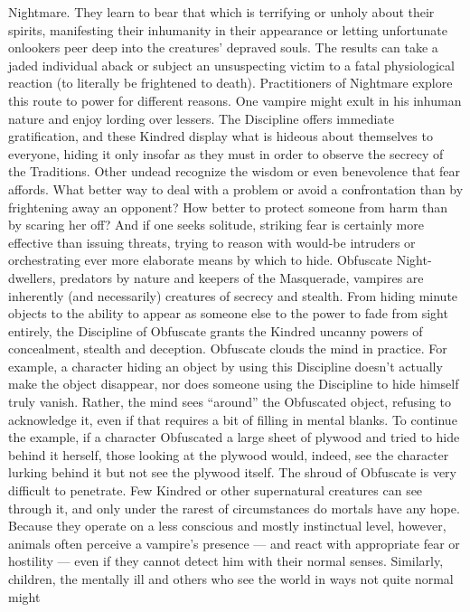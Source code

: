 \documentclass[10pt,a4paper]{article}
\begin{document}
Nightmare. They learn to bear that which is terrifying or unholy about their
spirits, manifesting their inhumanity in their appearance or letting
unfortunate onlookers peer deep into the creatures’ depraved souls. The
results can take a jaded individual aback or subject an unsuspecting victim
to a fatal physiological reaction (to literally be frightened to death).
Practitioners of Nightmare explore this route to power for different reasons.
One vampire might exult in his inhuman nature and enjoy lording over
lessers. The Discipline offers immediate gratification, and these Kindred
display what is hideous about themselves to everyone, hiding it only insofar
as they must in order to observe the secrecy of the Traditions. Other undead
recognize the wisdom or even benevolence that fear affords. What better
way to deal with a problem or avoid a confrontation than by frightening
away an opponent? How better to protect someone from harm than by
scaring her off? And if one seeks solitude, striking fear is certainly more
effective than issuing threats, trying to reason with would-be intruders or
orchestrating ever more elaborate means by which to hide.
Obfuscate
Night-dwellers, predators by nature and keepers of the Masquerade,
vampires are inherently (and necessarily) creatures of secrecy and stealth.
From hiding minute objects to the ability to appear as someone else to the
power to fade from sight entirely, the Discipline of Obfuscate grants the
Kindred uncanny powers of concealment, stealth and deception.
Obfuscate clouds the mind in practice. For example, a character hiding an
object by using this Discipline doesn’t actually make the object disappear,
nor does someone using the Discipline to hide himself truly vanish. Rather,
the mind sees “around” the Obfuscated object, refusing to acknowledge it,
even if that requires a bit of filling in mental blanks. To continue the
example, if a character Obfuscated a large sheet of plywood and tried to
hide behind it herself, those looking at the plywood would, indeed, see the
character lurking behind it but not see the plywood itself.
The shroud of Obfuscate is very difficult to penetrate. Few Kindred or other
supernatural creatures can see through it, and only under the rarest of
circumstances do mortals have any hope. Because they operate on a less
conscious and mostly instinctual level, however, animals often perceive a
vampire’s presence — and react with appropriate fear or hostility — even if
they cannot detect him with their normal senses. Similarly, children, the
mentally ill and others who see the world in ways not quite normal might
\end{document}
